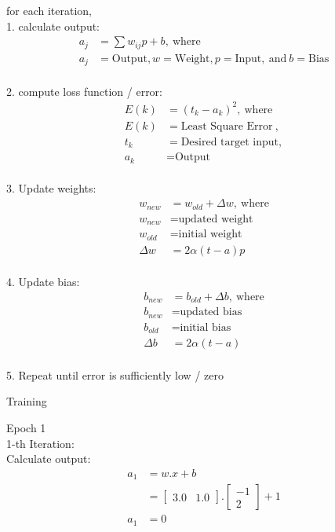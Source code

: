 \documentclass{article}
\begin{document}
	for each iteration, 
	\\ 1. calculate output:
	\begin{align*}
		a_j & = \sum w_{ij} p + b,~\text{where}\\
		a_j & = \text{Output}, w = \text{Weight}, p = \text{Input},~\text{and}~b = \text{Bias}
	\end{align*}
	\\ 2. compute loss function / error:
	\begin{align*}
		E(k) & = (t_k - a_k)^2,~\text{where} \\
		E(k) & = \text{Least Square Error}~, \\
		t_k & = \text{Desired target input}, \\
		a_k & = \text{Output}
	\end{align*}
	\\ 3. Update weights:
	\begin{align*}
		w_{new} & = w_{old} + \Delta w, ~\text{where} \\
		w_{new} & = \text{updated weight}\\
		w_{old} & = \text{initial weight} \\
		\Delta w & = 2 \alpha (t - a) p
	\end{align*}
	\\ 4. Update bias:
	\begin{align*}
		b_{new} & = b_{old} + \Delta b,~ \text{where} \\
		b_{new} & = \text{updated bias} \\
		b_{old} & = \text{initial bias} \\
		\Delta b & = 2 \alpha (t - a)
	\end{align*}
	\\ 5. Repeat until error is sufficiently low / zero
	\begin{center}
		\Large Training \\
	\end{center}
	Epoch 1 \\
	1-th Iteration: \\
	Calculate output: 
	\begin{equation}
		\begin{split}
			a_1 & = w.x+b \\
			& = \begin{bmatrix}
				3.0 & 1.0
			\end{bmatrix}. \begin{bmatrix}
				-1 \\ 2
			\end{bmatrix} + 1 \\
			a_1 & = 0
		\end{split}
	\end{equation}
\end{document}
